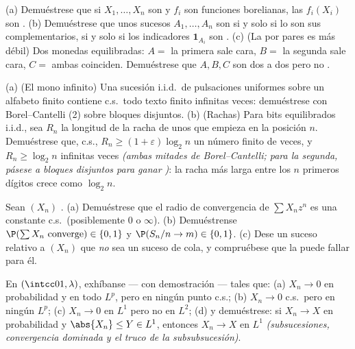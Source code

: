 \begin{exercise}[$\star\star$]\label{exo:b3:probability:3}
(a) Demuéstrese que si $X_1, \dots, X_n$ son
 y $f_i$ son
funciones borelianas, las $f_i(X_i)$ son
. (b)
Demuéstrese que unos sucesos $A_1, \dots, A_n$ son
 si y solo si lo
son sus complementarios, si y solo si los indicadores $\mathbf 1_{A_i}$
son 
. (c) (La
 por pares es más débil) Dos monedas equilibradas: $A = $
la primera sale cara, $B = $ la segunda sale cara, $C = $ ambas
coinciden. Demuéstrese que $A, B, C$ son
 dos a dos pero
no .
\end{exercise}

\begin{exercise}[$\star\star$]\label{exo:b3:probability:4}
(a) (El mono infinito) Una sucesión i.i.d.\ de pulsaciones uniformes
sobre un alfabeto finito contiene c.s.\ todo texto finito infinitas
veces: demuéstrese con Borel--Cantelli (2) sobre bloques disjuntos. (b)
(Rachas) Para bits equilibrados i.i.d., sea $R_n$ la longitud de la
racha de unos que empieza en la posición $n$. Demuéstrese que, c.s.,
$R_n \geq (1+\varepsilon)\log_2n$ un número finito de veces, y $R_n
\geq \log_2 n$ infinitas veces \emph{(ambas mitades de Borel--Cantelli;
para la segunda, pásese a bloques disjuntos para ganar
)}: la racha más
larga entre los $n$ primeros dígitos crece como $\log_2n$.
\end{exercise}

\begin{exercise}[$\star\star$]\label{exo:b3:probability:5}
Sean $(X_n)$ .
(a) Demuéstrese que el radio de convergencia de $\sum X_n z^n$ es una
constante c.s.\ (posiblemente $0$ o $\infty$). (b) Demuéstrense
$\P(\sum X_n \text{ converge}) \in \{0, 1\}$ y
$\P(S_n/n \to m) \in \{0,1\}$. (c) Dese un suceso relativo a $(X_n)$ que
\emph{no} sea un suceso de cola, y compruébese que la
 puede fallar para él.
\end{exercise}

\begin{exercise}[$\star\star$]\label{exo:b3:probability:6}
En $(\intcc01, \lambda)$, exhíbanse --- con demostración ---
 tales que: (a)
$X_n \to 0$ en probabilidad y en todo $L^p$, pero en ningún punto c.s.;
(b) $X_n \to 0$ c.s.\ pero en ningún $L^p$; (c) $X_n \to 0$ en $L^1$
pero no en $L^2$; (d) y demuéstrese: si $X_n \to X$ en probabilidad y
$\abs{X_n}
\leq Y \in L^1$, entonces $X_n \to X$ en $L^1$ \emph{(subsucesiones,
convergencia dominada y el truco de la subsubsucesión)}.
\end{exercise}

